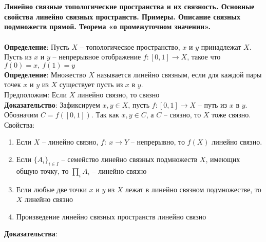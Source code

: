 \newpage
\section{}
	\textbf{Линейно связные топологические пространства и их связность. Основные свойства линейно связных пространств. Примеры. Описание связных подмножеств прямой. Теорема «о промежуточном значении».}\\
	\\
	\textbf{Определение}: Пусть $X$ -- топологическое пространство, $x$ и $y$ принадлежат $X$. Пусть из $x$ и $y$ -- непрерывное отображение $f:[0,1] \rightarrow X$, такое что $f(0) = x,\ f(1) = y$\\
	\textbf{Определение}: Множество $X$ называется линейно связным, если для каждой пары точек $x$ и $y$ из $X$ существует пусть из $x$ в $y$.\\
	Предположим: Если $X$ линейно связно, то связно\\
	\textbf{Доказательство}: Зафиксируем $x,y\in X$, пусть $f:[0,1]\rightarrow X$ -- путь из $x$ в $y$. Обозначим $C = f([0,1])$. Так как $x,y \in C$, а $C$ -- связно, то $X$ тоже связно.\\
	Свойства:\\
	\begin{enumerate}
		\item 
		Если $X$ -- линейно связно, $f:\ x\rightarrow Y$ -- непрерывно, то $f(X)$ линейно связно.\\
		\item
		Если $\{A_i\}_{i\in I}$ -- семейство линейно связных подмножеств $X$, имеющих общую точку, то $\prod_i A_i$ -- линейно связно
		\item 
		Если любые две точки $x$ и $y$ из $X$ лежат в линейно связном подмножестве, то $X$ линейно связно
		\item 
		Произведение линейно связных пространств линейно связно
	\end{enumerate}
	\textbf{Доказательства}:
